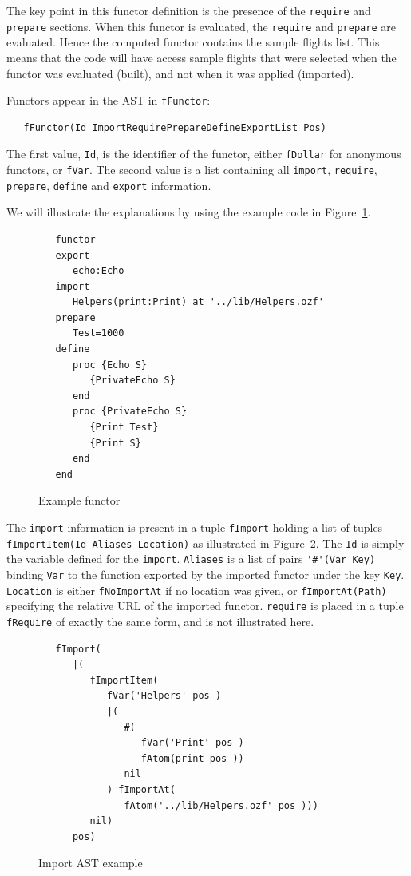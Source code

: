 \documentclass[a4paper]{memoir}
\begin{document}
The key point in this functor definition is the presence of the
\lstinline!require! and \lstinline!prepare! sections. When this functor is
evaluated, the \lstinline!require! and \lstinline!prepare! are evaluated.
Hence the computed functor contains the sample flights list.
This means that the code will have access sample flights that were selected when
the functor was evaluated (built), and not when it was applied (imported).

Functors appear in the AST in \lstinline!fFunctor!:
\begin{lstlisting}
   fFunctor(Id ImportRequirePrepareDefineExportList Pos)
\end{lstlisting}
The first value, \lstinline!Id!, is the identifier of the functor, either
\lstinline!fDollar! for anonymous functors, or \lstinline!fVar!.
The second value is a list containing all \lstinline!import!,
\lstinline!require!, \lstinline!prepare!, \lstinline!define! and
\lstinline!export! information. 

We will illustrate the explanations by using the example code in
Figure~\ref{fig:functor_example_code}.
\begin{figure}[ht]
\begin{lstlisting}
   functor
   export
      echo:Echo
   import
      Helpers(print:Print) at '../lib/Helpers.ozf'
   prepare
      Test=1000
   define
      proc {Echo S}
         {PrivateEcho S}
      end
      proc {PrivateEcho S}
         {Print Test}
         {Print S}
      end
   end
\end{lstlisting}
\caption{Example functor}
\label{fig:functor_example_code}
\end{figure}


The \lstinline!import! information is present in a tuple \lstinline!fImport!
holding a list of tuples \lstinline!fImportItem(Id Aliases Location)! as illustrated in
Figure~\ref{fig:functor_example_import}.
The \lstinline!Id! is simply the variable defined for the \lstinline!import!.
\lstinline!Aliases! is a list of pairs \lstinline!'#'(Var Key)! binding
\lstinline!Var! to the function exported by the imported functor under the key
\lstinline!Key!.
\lstinline!Location! is either \lstinline!fNoImportAt! if no location was given,
or \lstinline!fImportAt(Path)! specifying the relative URL of the imported functor.
\lstinline!require! is placed in a tuple \lstinline!fRequire! of exactly the same form, and is not illustrated here.

\begin{figure}[ht]
\begin{lstlisting}
   fImport(
      |(
         fImportItem(
            fVar('Helpers' pos )
            |(
               #(
                  fVar('Print' pos )
                  fAtom(print pos ))
               nil
            ) fImportAt(
               fAtom('../lib/Helpers.ozf' pos )))
         nil)
      pos)
\end{lstlisting}
\caption{Import AST example}
\label{fig:functor_example_import}
\end{figure}
\end{document}
